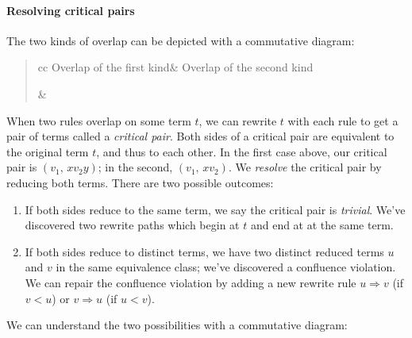 \documentclass[../generics]{subfiles}
\begin{document}
\paragraph{Resolving critical pairs}
The two kinds of overlap can be depicted with a commutative diagram:
\begin{quote}
\begin{tabular}{cc}
Overlap of the first kind&
Overlap of the second kind\\
&
\end{tabular}
\end{quote}
When two rules overlap on some term $t$, we can rewrite $t$ with each rule to get a pair of terms called a \emph{critical pair}. Both sides of a critical pair are equivalent to the original term $t$, and thus to each other. In the first case above, our critical pair is $(v_1,\,xv_2y)$; in the second, $(v_1,\,xv_2)$. We \emph{resolve} the critical pair by reducing both terms. There are two possible outcomes:
\begin{enumerate}
\item If both sides reduce to the same term, we say the critical pair is \emph{trivial}. We've discovered two rewrite paths which begin at $t$ and end at at the same term.
\item If both sides reduce to distinct terms, we have two distinct reduced terms $u$ and $v$ in the same equivalence class; we've discovered a confluence violation. We can repair the confluence violation by adding a new rewrite rule $u\Rightarrow v$ (if $v<u$) or $v\Rightarrow u$ (if $u<v$).
\end{enumerate}
We can understand the two possibilities with a commutative diagram:
\end{document}
